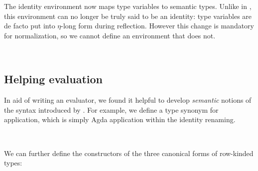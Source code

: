 \documentclass[authoryear, acmsmall, screen, review, nonacm]{acmart}
\begin{document}
The identity environment now maps type variables to semantic types. Unlike in \citet{ChapmanKNW19}, this environment can no longer be truly said to be an identity: type variables are de facto put into $\eta$-long form during reflection. However this change is mandatory for normalization, so we cannot define an environment that does not.

\begin{code}%
\>[0]\AgdaSpace{}%
\AgdaSymbol{:}\AgdaSpace{}%
\AgdaSpace{}%
\AgdaSpace{}%
\<%
\\
\>[0]\AgdaSpace{}%
\AgdaSymbol{=}\AgdaSpace{}%
\AgdaSpace{}%
\AgdaSpace{}%
\<%
\end{code}

\subsection{Helping evaluation}

In aid of writing an evaluator, we found it helpful to develop \emph{semantic} notions of the syntax introduced by \Rome. For example, we define a type synonym for application, which is simply Agda application within the identity renaming.

\begin{code}%
\>[0]\AgdaSpace{}%
\AgdaSymbol{:}\AgdaSpace{}%
\AgdaSpace{}%
\AgdaSpace{}%
\AgdaSymbol{(}\AgdaSpace{}%
\AgdaSpace{}%
\AgdaSymbol{)}\AgdaSpace{}%
\AgdaSpace{}%
\AgdaSpace{}%
\AgdaSpace{}%
\AgdaSpace{}%
\AgdaSpace{}%
\AgdaSpace{}%
\AgdaSpace{}%
\<%
\\
\>[0]\AgdaSpace{}%
\AgdaSpace{}%
\AgdaSpace{}%
\AgdaSymbol{=}\AgdaSpace{}%
\AgdaSpace{}%
\AgdaSpace{}%
\<%
\end{code}

We can further define the constructors of the three canonical forms of row-kinded types:
\end{document}

